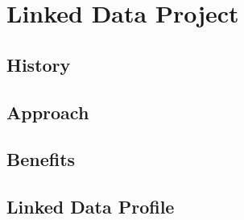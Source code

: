 \chapter{Linked Data Project}

\section{History}

\section{Approach}

\section{Benefits}

\section{Linked Data Profile}

